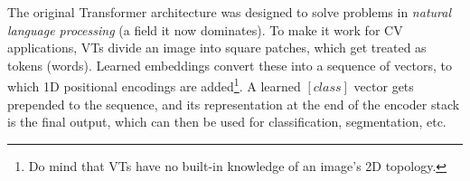 The original Transformer architecture was designed to solve problems in \textit{natural language processing} (a field it now dominates). To make it work for CV applications, VTs divide an image into square patches, which get treated as tokens (words). Learned embeddings convert these into a sequence of vectors, to which 1D positional encodings are added\footnote{Do mind that VTs have no built-in knowledge of an image's 2D topology.}. A learned $[class]$ vector gets prepended to the sequence, and its representation at the end of the encoder stack is the final output, which can then be used for classification, segmentation, etc.






